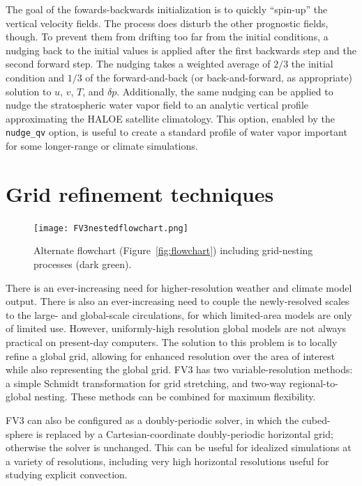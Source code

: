 \documentclass[10pt,letterpaper,margin=1in]{memoir}
\begin{document}
The goal of the fowards-backwards initialization is to quickly ``spin-up'' the vertical velocity fields. The process does disturb the other prognostic fields, though. To prevent them from drifting too far from the initial conditions, a nudging back to the initial values is applied after the first backwards step and the second forward step. The nudging takes a weighted average of $2/3$ the initial condition and $1/3$ of the forward-and-back (or back-and-forward, as appropriate) solution to $u$, $v$, $T$, and $\delta p$. Additionally, the same nudging can be applied to nudge the stratospheric water vapor field to an analytic vertical profile approximating the HALOE satellite climatology. This option, enabled by the \texttt{nudge_qv} option, is useful to create a standard profile of water vapor important for some longer-range or climate simulations.


\chapter{Grid refinement techniques} \label{chap:refinement}

\begin{figure}[t] %
   \centering
   \texttt{[image: FV3nestedflowchart.png]} 
   \caption{Alternate flowchart (Figure~\ref{fig:flowchart}) including grid-nesting processes (dark green).}
   \label{fig:nestedflowchart}
\end{figure}

There is an ever-increasing need for higher-resolution weather and climate model output. There is also an ever-increasing need to couple the newly-resolved scales to the large- and global-scale circulations, for which limited-area models are only of limited use. However, uniformly-high resolution global models are not always practical on present-day computers. The solution to this problem is to locally refine a global grid, allowing for enhanced resolution over the area of interest while also representing the global grid. FV3 has two variable-resolution methods: a simple Schmidt transformation for grid stretching, and two-way regional-to-global nesting. These methods can be combined for maximum flexibility. 

FV3 can also be configured as a doubly-periodic solver, in which the cubed-sphere is replaced by a Cartesian-coordinate doubly-periodic horizontal grid; otherwise the solver is unchanged. This can be useful for idealized simulations at a variety of resolutions, including very high horizontal resolutions useful for studying explicit convection. 
\end{document}
